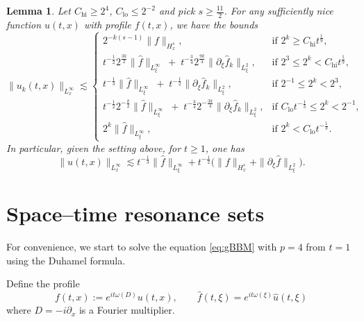 \documentclass[reqno,english,11pt]{amsart}
\newtheorem{lemma}[theorem]{Lemma}
\theoremstyle{definition}
\numberwithin{equation}{section}
\begin{document}
\begin{lemma}\label{lem:poitwise}
Let $C_{\mathrm{hi}} \ge 2^4$, $C_{\mathrm{lo}} \le 2^{-2}$ and pick $s \ge \tfrac{11}{2}$.
For any sufficiently nice function $u(t,x)$ with profile $f(t,x)$, we have the bounds
\begin{equation}\label{frequencybounds}
\|u_k(t,x)\|_{L_x^\infty} \lesssim
\begin{cases}
2^{-k(s-1)} \|f\|_{H_x^s},
& \text{if } 2^k \ge C_{\mathrm{hi}} t^{\frac{1}{9}}, \\[6pt]

t^{-\frac{1}{2}} 2^{\frac{3k}{2}} \|\widehat{f}\|_{L_\xi^\infty}
\;+\;
t^{-\frac{3}{4}} 2^{\frac{9k}{4}} \|\partial_\xi \widehat{f}_k\|_{L_\xi^2},
& \text{if } 2^3 \le 2^k < C_{\mathrm{hi}} t^{\frac{1}{9}}, \\[6pt]

t^{-\frac{1}{3}} \|\widehat{f}\|_{L_\xi^\infty}
\;+\;
t^{-\frac{1}{2}} \|\partial_\xi \widehat{f}_k\|_{L_\xi^2},
& \text{if } 2^{-1} \le 2^k < 2^3, \\[6pt]

t^{-\frac{1}{2}} 2^{-\frac{k}{2}} \|\widehat{f}\|_{L_\xi^\infty}
\;+\;
t^{-\frac{3}{4}} 2^{-\frac{3k}{4}} \|\partial_\xi \widehat{f}_k\|_{L_\xi^2},
& \text{if } C_{\mathrm{lo}} t^{-\frac{1}{3}} \le 2^k < 2^{-1}, \\[6pt]

2^k \|\widehat{f}\|_{L_\xi^\infty},
& \text{if } 2^k < C_{\mathrm{lo}} t^{-\frac{1}{3}}.
\end{cases}
\end{equation}
In particular, given the setting above,  for $t\geq1$, one has
\begin{equation}
    \|u(t,x)\|_{L_x^\infty} \lesssim  t^{-\frac{1}{3}} \|\widehat{f}\|_{L_\xi^\infty}+ t^{-\frac{1}{2}} \Big(\|f\|_{H_x^s}+\|\partial_\xi \widehat{f}\|_{L_\xi^2}\Big).
\end{equation}

    
\end{lemma}


\section{Space--time resonance sets}

For convenience, we start to solve the equation \eqref{eq:gBBM} with $p=4$ from $t=1$ using the Duhamel formula.

Define the profile
$$f(t,x):=e^{it\omega(D)}u(t,x),\qquad \widehat{f}(t,\xi)=e^{it\omega(\xi)}\widehat{u}(t,\xi)$$
where $D=-i\partial_x$ is a Fourier multiplier.
\end{document}
